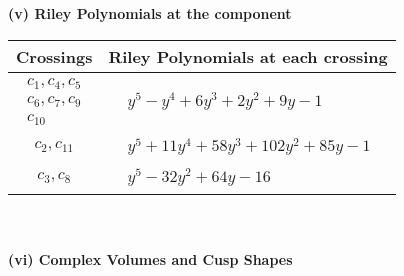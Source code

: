 \documentclass[1p]{elsarticle_modified}
\theoremstyle{definition}
\begin{document}
\newpage\renewcommand{\arraystretch}{1}
\flushleft \textbf{(v) Riley Polynomials at the component}\newline \\
\begin{tabular}{m{50pt}|m{274pt}}
Crossings & \hspace{64pt}Riley Polynomials at each crossing \\
\hline $$\begin{aligned}c_{1},c_{4},c_{5}\\c_{6},c_{7},c_{9}\\c_{10}\end{aligned}$$&$\begin{aligned}
&y^5- y^4+6 y^3+2 y^2+9 y-1
\end{aligned}$\\
\hline $$\begin{aligned}c_{2},c_{11}\end{aligned}$$&$\begin{aligned}
&y^5+11 y^4+58 y^3+102 y^2+85 y-1
\end{aligned}$\\
\hline $$\begin{aligned}c_{3},c_{8}\end{aligned}$$&$\begin{aligned}
&y^5-32 y^2+64 y-16
\end{aligned}$\\
\hline
\end{tabular}\\~\\
\newpage\flushleft \textbf{(vi) Complex Volumes and Cusp Shapes}
\end{document}
